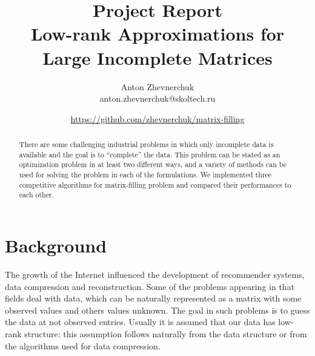 \documentclass[12pt]{article}
\begin{document}
\title{Project Report \\ Low-rank Approximations for Large Incomplete Matrices}
\author{Anton Zhevnerchuk \\ anton.zhevnerchuk@skoltech.ru}
\date{\url{https://github.com/zhevnerchuk/matrix-filling}}

\maketitle

\begin{abstract}
There are some challenging industrial problems in which only incomplete data is available and the goal is to ``complete'' the data. This problem can be stated as an optimization problem in at least two different ways, and a variety of methods can be used for solving the problem in each of the formulations. We implemented three competitive algorithms for matrix-filling problem and compared their performances to each other.
\end{abstract}

\tableofcontents

\section{Background}

The growth of the Internet influenced the development of recommender systems, data compression and reconstruction. Some of the problems appearing in that fields deal with data, which can be naturally represented as a matrix with some observed values and others values unknown. The goal in such problems is to guess the data at not observed entries. Usually it is assumed that our data has low-rank structure: this assumption follows naturally from the data structure or from the algorithms used for data compression.


\end{document}
